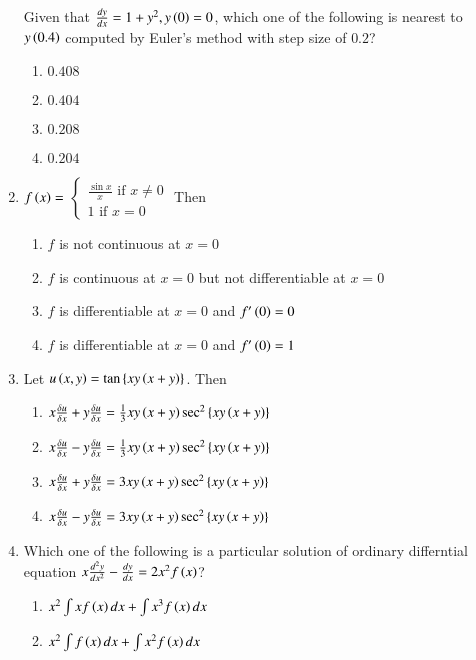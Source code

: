 \documentclass[journal]{IEEEtran}
\begin{document}
\begin{enumerate}
{Given that $\frac{dy}{dx}=1+y^2,y\left(0\right)=0$, which one of the following is nearest to $y\left(0.4\right)$ computed by Euler's method with step size of $0.2$?
\begin{multicols}{4}
\begin{enumerate}
\item $0.408$
\item $0.404$
\item $0.208$
\item $0.204$
\end{enumerate}
\end{multicols}
}
\item{
$f\left(x\right)=$
$\begin{cases}
\frac{\sin x}{x} \text{ if }x\neq 0\\
1\text{ if }x=0
\end{cases}$
Then
\begin{enumerate}
\item $f$ is not continuous at $x=0$
\item $f$ is continuous at $x=0$ but not differentiable at $x=0$
\item $f$ is differentiable at $x=0$ and $f^{\prime}\left(0\right)=0$
\item $f$ is differentiable at $x=0$ and $f^{\prime}\left(0\right)=1$
\end{enumerate}
}
\item{
Let $u\left(x,y\right)=\tan\left\{xy\left(x+y\right)\right\}$. Then
\begin{enumerate}
\item $x\frac{\delta u}{\delta x}+y\frac{\delta u}{\delta x}=\frac{1}{3}xy\left(x+y\right)\sec^2\left\{xy\left(x+y\right)\right\}$
\item $x\frac{\delta u}{\delta x}-y\frac{\delta u}{\delta x}=\frac{1}{3}xy\left(x+y\right)\sec^2\left\{xy\left(x+y\right)\right\}$
\item $x\frac{\delta u}{\delta x}+y\frac{\delta u}{\delta x}=3xy\left(x+y\right)\sec^2\left\{xy\left(x+y\right)\right\}$
\item $x\frac{\delta u}{\delta x}-y\frac{\delta u}{\delta x}=3xy\left(x+y\right)\sec^2\left\{xy\left(x+y\right)\right\}$
\end{enumerate}
}
\item{
Which one of the following is a particular solution of ordinary differntial equation $x\frac{d^2y}{dx^2}-\frac{dy}{dx}=2x^2f\left(x\right)$?
\begin{multicols}{2}
\begin{enumerate}
\item $x^2\int xf\left(x\right)dx+\int x^3f\left(x\right)dx$
\item $x^2\int f\left(x\right)dx+\int x^2f\left(x\right)dx$

\end{enumerate}
\end{multicols}}
\end{enumerate}
\end{document}

